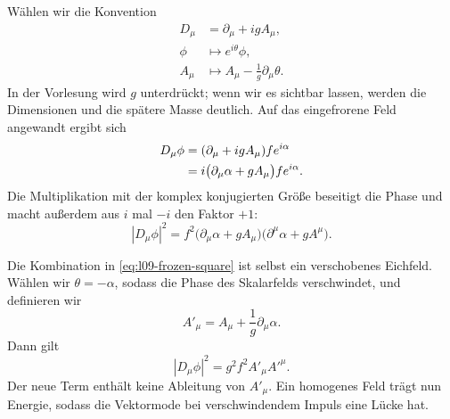 Wählen wir die Konvention
\begin{equation}
\begin{aligned}
  D_\mu&=\partial_\mu+igA_\mu,
  \\
  \phi&\longmapsto e^{i\theta}\phi,
  \\
  A_\mu&\longmapsto A_\mu-\frac1g\partial_\mu\theta .
\end{aligned}
  \label{eq:l09-gauge-convention}
\end{equation}
In der Vorlesung wird \(g\) unterdrückt; wenn wir es sichtbar lassen, werden die Dimensionen und die spätere Masse deutlich. Auf das eingefrorene Feld angewandt ergibt sich
\begin{align}
  D_\mu\phi
  &=(\partial_\mu+igA_\mu)f e^{i\alpha}
  \notag\\
  &=i\bigl(\partial_\mu\alpha+gA_\mu\bigr)
    f e^{i\alpha}.
  \label{eq:l09-covariant-frozen}
\end{align}
Die Multiplikation mit der komplex konjugierten Größe beseitigt die Phase und macht außerdem aus \(i\) mal \(-i\) den Faktor \(+1\):
\begin{equation}
  |D_\mu\phi|^2
  =f^2
   \bigl(\partial_\mu\alpha+gA_\mu\bigr)
   \bigl(\partial^\mu\alpha+gA^\mu\bigr).
  \label{eq:l09-frozen-square}
\end{equation}

\begin{classroomqa}
\end{classroomqa}

Die Kombination in \eqref{eq:l09-frozen-square} ist selbst ein verschobenes Eichfeld. Wählen wir \(\theta=-\alpha\), sodass die Phase des Skalarfelds verschwindet, und definieren wir
\begin{equation}
  A'_\mu=A_\mu+\frac1g\partial_\mu\alpha .
  \label{eq:l09-unitary-gauge-field}
\end{equation}
Dann gilt
\begin{equation}
  |D_\mu\phi|^2=g^2f^2 A'_\mu A'^\mu .
  \label{eq:l09-vector-mass-term}
\end{equation}
Der neue Term enthält keine Ableitung von \(A'_\mu\). Ein homogenes Feld trägt nun Energie, sodass die Vektormode bei verschwindendem Impuls eine Lücke hat.

